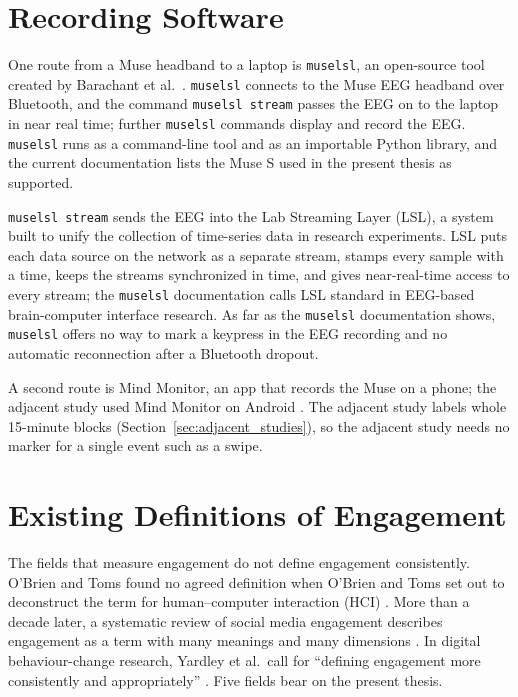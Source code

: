 \documentclass[12pt,a4paper]{report}
\makeatletter
\let\@runninghead\@empty
\newcommand{\runninghead}[1]{\gdef\@runninghead{#1}}
\makeatother
\begin{document}
\section{Recording Software}
\label{sec:libraries}
One route from a Muse headband to a laptop is \texttt{muselsl}, an open-source tool created by Barachant et al.\ \cite{barachant_muselsl_2026}. \texttt{muselsl} connects to the Muse EEG headband over Bluetooth, and the command \texttt{muselsl stream} passes the EEG on to the laptop in near real time; further \texttt{muselsl} commands display and record the EEG. \texttt{muselsl} runs as a command-line tool and as an importable Python library, and the current documentation lists the Muse S used in the present thesis as supported.

\texttt{muselsl stream} sends the EEG into the Lab Streaming Layer (LSL), a system built to unify the collection of time-series data in research experiments. LSL puts each data source on the network as a separate stream, stamps every sample with a time, keeps the streams synchronized in time, and gives near-real-time access to every stream; the \texttt{muselsl} documentation calls LSL standard in EEG-based brain-computer interface research. As far as the \texttt{muselsl} documentation shows, \texttt{muselsl} offers no way to mark a keypress in the EEG recording and no automatic reconnection after a Bluetooth dropout.

A second route is Mind Monitor, an app that records the Muse on a phone; the adjacent study used Mind Monitor on Android \cite{rahman_detection_2025}. The adjacent study labels whole 15-minute blocks (Section~\ref{sec:adjacent_studies}), so the adjacent study needs no marker for a single event such as a swipe.

\runninghead{Existing Definitions of Engagement}
\section{Existing Definitions of Engagement}
\label{sec:engagement_definitions}

The fields that measure engagement do not define engagement consistently. O'Brien and Toms found no agreed definition when O'Brien and Toms set out to deconstruct the term for human--computer interaction (HCI) \cite{obrien_what_2008}. More than a decade later, a systematic review of social media engagement describes engagement as a term with many meanings and many dimensions \cite{trunfio_conceptualising_2021}. In digital behaviour-change research, Yardley et al.\ call for ``defining engagement more consistently and appropriately'' \cite{yardley_understanding_2016}. Five fields bear on the present thesis.
\end{document}
